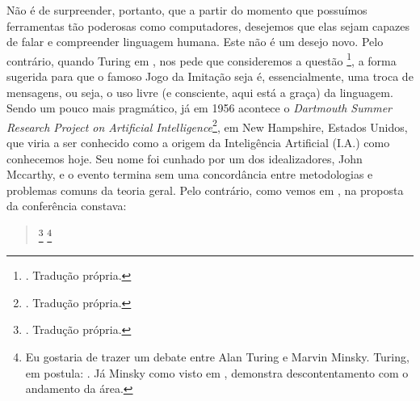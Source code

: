 Não é de surpreender, portanto, que a partir do momento que possuímos ferramentas tão poderosas como computadores, desejemos que elas sejam capazes de falar e compreender linguagem humana. Este não é um desejo novo. Pelo contrário, quando Turing em , nos pede que consideremos a questão \footnote{. Tradução própria.}, a forma sugerida para que o famoso Jogo da Imitação seja  é, essencialmente, uma troca de mensagens, ou seja, o uso livre (e consciente, aqui está a graça) da linguagem. Sendo um pouco mais pragmático, já em 1956 acontece o \textit{Dartmouth Summer Research Project on Artificial Intelligence}\footnote{. Tradução própria.}, em New Hampshire, Estados Unidos, que viria a ser conhecido como a origem da Inteligência Artificial (I.A.) como conhecemos hoje. Seu nome foi cunhado por um dos idealizadores, John Mccarthy, e o evento termina sem uma concordância entre metodologias e problemas comuns da teoria geral. Pelo contrário, como vemos em , na proposta da conferência constava:
\begin{quote}
    \footnote{. Tradução própria.}
    \footnote{Eu gostaria de trazer um debate entre Alan Turing e Marvin Minsky. Turing, em  postula: . Já Minsky como visto em , demonstra descontentamento com o andamento da área. }
\end{quote}

